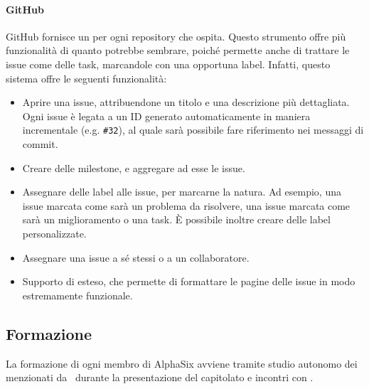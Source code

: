    		\paragraph{GitHub}\label{Github}
			GitHub fornisce un  per ogni repository che ospita. Questo strumento offre più funzionalità di quanto potrebbe sembrare,
			poich\'e permette anche di trattare le issue come delle task, marcandole con una opportuna label. Infatti, questo sistema offre le seguenti funzionalità:
			\begin{itemize}
				\item Aprire una issue, attribuendone un titolo e una descrizione più dettagliata. Ogni issue è legata a un ID generato automaticamente in maniera
					incrementale (e.g. \texttt{\#32}), al quale sarà possibile fare riferimento nei messaggi di commit.
				\item Creare delle milestone, e aggregare ad esse le issue.
				\item Assegnare delle label alle issue, per marcarne la natura. Ad esempio, una issue marcata come  sarà un problema da risolvere, una
					issue marcata come  sarà un miglioramento o una task. È possibile inoltre creare delle label personalizzate.
				\item Assegnare una issue a s\'e stessi o a un collaboratore.
				\item Supporto di  esteso, che permette di
				formattare le pagine delle issue in modo estremamente funzionale.
			\end{itemize}



	\subsection{Formazione}

		La formazione di ogni membro di AlphaSix avviene tramite studio autonomo dei  menzionati da \II\ durante la presentazione del capitolato e incontri con \gruppo.

